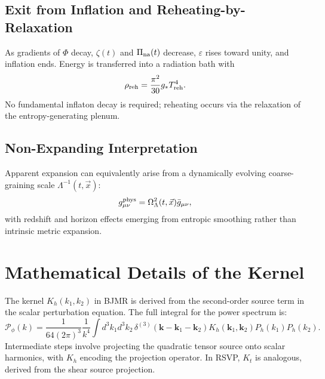 \documentclass[12pt, a4paper, openany]{book}
\theoremstyle{definition}
\begin{document}
\section{Exit from Inflation and Reheating-by-Relaxation}
As gradients of $\Phi$ decay, $\zeta(t)$ and $\Pi_{\rm na}(t)$ decrease, $\varepsilon$ rises toward unity, and inflation ends. Energy is transferred into a radiation bath with
\begin{equation}
    \rho_{\rm reh} = \frac{\pi^2}{30} g_* T_{\rm reh}^4.
\end{equation}
No fundamental inflaton decay is required; reheating occurs via the relaxation of the entropy-generating plenum.

\section{Non-Expanding Interpretation}
Apparent expansion can equivalently arise from a dynamically evolving coarse-graining scale $\Lambda^{-1}(t,\vec x)$:
\begin{equation}
    g_{\mu\nu}^{\rm phys} = \Omega_\Lambda^2(t,\vec x) \bar g_{\mu\nu},
\end{equation}
with redshift and horizon effects emerging from entropic smoothing rather than intrinsic metric expansion.

\chapter{Mathematical Details of the Kernel}
The kernel $K_h(k_1,k_2)$ in BJMR is derived from the second-order source term in the scalar perturbation equation. The full integral for the power spectrum is:
\begin{equation}
\mathcal{P}_\phi(k) = \frac{1}{64 (2\pi)^3} \frac{1}{k^4} \int d^3 k_1 d^3 k_2 \, \delta^{(3)}(\mathbf{k} - \mathbf{k}_1 - \mathbf{k}_2) K_h(\mathbf{k}_1, \mathbf{k}_2) P_h(k_1) P_h(k_2).
\end{equation}
Intermediate steps involve projecting the quadratic tensor source onto scalar harmonics, with $K_h$ encoding the projection operator. In RSVP, $K_t$ is analogous, derived from the shear source projection.
\end{document}
